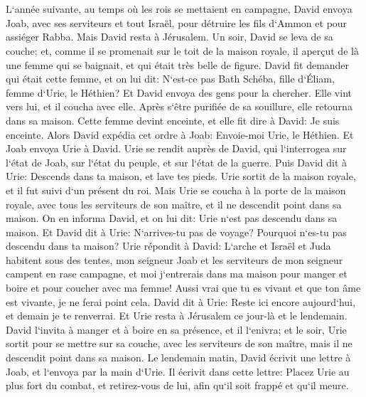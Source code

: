 \chapter{}

\verse L`année suivante, au temps où les rois se mettaient en campagne, David envoya Joab, avec ses serviteurs et tout Israël, pour détruire les fils d`Ammon et pour assiéger Rabba. Mais David resta à Jérusalem. 
\verse Un soir, David se leva de sa couche; et, comme il se promenait sur le toit de la maison royale, il aperçut de là une femme qui se baignait, et qui était très belle de figure. 
\verse David fit demander qui était cette femme, et on lui dit: N`est-ce pas Bath Schéba, fille d`Éliam, femme d`Urie, le Héthien? 
\verse Et David envoya des gens pour la chercher. Elle vint vers lui, et il coucha avec elle. Après s`être purifiée de sa souillure, elle retourna dans sa maison. 
\verse Cette femme devint enceinte, et elle fit dire à David: Je suis enceinte. 
\verse Alors David expédia cet ordre à Joab: Envoie-moi Urie, le Héthien. Et Joab envoya Urie à David. 
\verse Urie se rendit auprès de David, qui l`interrogea sur l`état de Joab, sur l`état du peuple, et sur l`état de la guerre. 
\verse Puis David dit à Urie: Descends dans ta maison, et lave tes pieds. Urie sortit de la maison royale, et il fut suivi d`un présent du roi. 
\verse Mais Urie se coucha à la porte de la maison royale, avec tous les serviteurs de son maître, et il ne descendit point dans sa maison. 
\verse On en informa David, et on lui dit: Urie n`est pas descendu dans sa maison. Et David dit à Urie: N`arrives-tu pas de voyage? Pourquoi n`es-tu pas descendu dans ta maison? 
\verse Urie répondit à David: L`arche et Israël et Juda habitent sous des tentes, mon seigneur Joab et les serviteurs de mon seigneur campent en rase campagne, et moi j`entrerais dans ma maison pour manger et boire et pour coucher avec ma femme! Aussi vrai que tu es vivant et que ton âme est vivante, je ne ferai point cela. 
\verse David dit à Urie: Reste ici encore aujourd`hui, et demain je te renverrai. Et Urie resta à Jérusalem ce jour-là et le lendemain. 
\verse David l`invita à manger et à boire en sa présence, et il l`enivra; et le soir, Urie sortit pour se mettre sur sa couche, avec les serviteurs de son maître, mais il ne descendit point dans sa maison. 
\verse Le lendemain matin, David écrivit une lettre à Joab, et l`envoya par la main d`Urie. 
\verse Il écrivit dans cette lettre: Placez Urie au plus fort du combat, et retirez-vous de lui, afin qu`il soit frappé et qu`il meure. 
